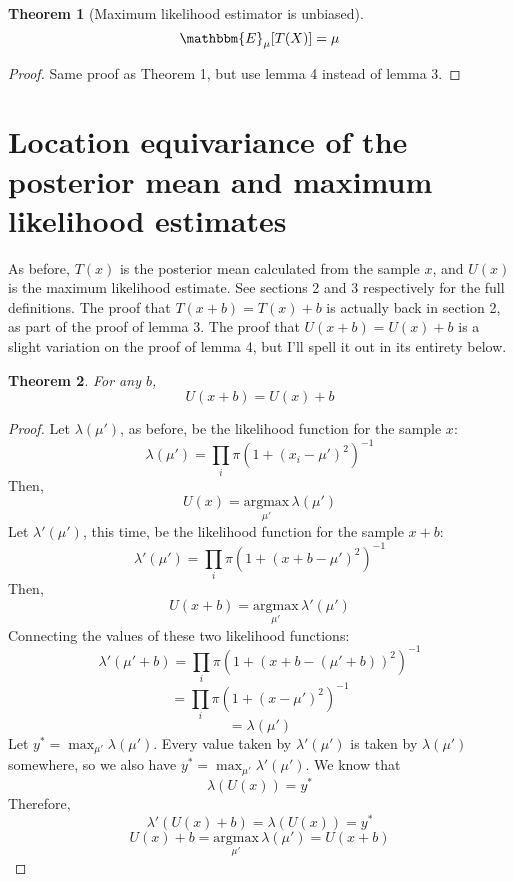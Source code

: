 \documentclass{article}
\newtheorem{theorem}{Theorem}
\newcommand{\condexp}[2]{\mathbbm{E}_{#1}[#2]}
\newcommand{\argmax}[1]{\underset{#1}{\text{argmax}}\,}
\begin{document}
\begin{theorem}[Maximum likelihood estimator is unbiased]$$\condexp{\mu}{T(X)}=\mu$$\end{theorem}
\begin{proof}
Same proof as Theorem 1, but use lemma 4 instead of lemma 3.
\end{proof}

\section{Location equivariance of the posterior mean and maximum likelihood estimates}
As before, $T(x)$ is the posterior mean calculated from the sample $x$, and $U(x)$ is the maximum likelihood estimate. See sections 2 and 3 respectively for the full definitions. The proof that $T(x+b)=T(x)+b$ is actually back in section 2, as part of the proof of lemma 3. The proof that $U(x+b) = U(x)+b$ is a slight variation on the proof of lemma 4, but I'll spell it out in its entirety below.
\begin{theorem} For any $b$, $$U(x+b)=U(x)+b$$\end{theorem}
\begin{proof}
Let $\lambda(\mu')$, as before, be the likelihood function for the sample $x$:
$$\lambda(\mu') = \prod_i \pi(1 + (x_i-\mu')^2)^{-1}$$
Then,
$$U(x) = \argmax{\mu'} \lambda(\mu')$$
Let $\lambda'(\mu')$, this time, be the likelihood function for the sample $x+b$:
$$\lambda'(\mu') = \prod_i \pi(1 + (x+b-\mu')^2)^{-1}$$
Then,
$$U(x+b) = \argmax{\mu'} \lambda'(\mu')$$
Connecting the values of these two likelihood functions:
$$\lambda'(\mu'+b) = \prod_i \pi(1 + (x+b-(\mu'+b))^2)^{-1}$$
$$ = \prod_i \pi(1 + (x-\mu')^2)^{-1}$$
$$ = \lambda(\mu')$$
Let $y^*=\max_{\mu'} \lambda(\mu')$. Every value taken by $\lambda'(\mu')$ is taken by $\lambda(\mu')$ somewhere, so we also have $y^*=\max_{\mu'} \lambda'(\mu')$. We know that
$$\lambda(U(x)) = y^*$$
Therefore,
$$\lambda'(U(x)+b) = \lambda(U(x)) = y^*$$
$$U(x)+b = \argmax{\mu'} \lambda(\mu') = U(x+b)$$
\end{proof}
\end{document}
